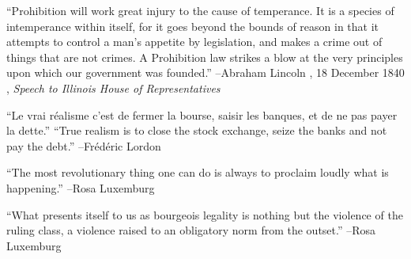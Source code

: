 \documentclass{article}%
\begin{document}
\linebreak%
\vspace{1mm}%
\begin{minipage}{\textwidth}%
\flushleft%
“Prohibition will work great injury to the cause of temperance. It is a species of intemperance within itself, for it goes beyond the bounds of reason in that it attempts to control a man's appetite by legislation, and makes a crime out of things that are not crimes. A Prohibition law strikes a blow at the very principles upon which our government was founded.”%
\linebreak%
\vspace{1mm}%
–Abraham Lincoln%
, 18 December 1840%
, \textit{Speech to Illinois House of Representatives}%
\linebreak%
\vspace{1mm}%
\end{minipage}%
\linebreak%
\vspace{1mm}%
\begin{minipage}{\textwidth}%
\flushleft%
“Le vrai réalisme c'est de fermer la bourse, saisir les banques, et de ne pas payer la dette.”%
\linebreak%
\vspace{1mm}%
“True realism is to close the stock exchange, seize the banks and not pay the debt.”%
\linebreak%
–Frédéric Lordon%
\linebreak%
\vspace{1mm}%
\end{minipage}%
\linebreak%
\vspace{1mm}%
\begin{minipage}{\textwidth}%
\flushleft%
“The most revolutionary thing one can do is always to proclaim loudly what is happening.”%
\linebreak%
\vspace{1mm}%
–Rosa Luxemburg%
\linebreak%
\vspace{1mm}%
\end{minipage}%
\linebreak%
\vspace{1mm}%
\begin{minipage}{\textwidth}%
\flushleft%
“What presents itself to us as bourgeois legality is nothing but the violence of the ruling class, a violence raised to an obligatory norm from the outset.”%
\linebreak%
\vspace{1mm}%
–Rosa Luxemburg%
\linebreak%
\vspace{1mm}%
\end{minipage}%
\end{document}
